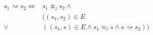 \begin{align*}
  s_1 \rightsquigarrow s_2 \Longleftrightarrow
    & s_1 \not\approx_l s_2 \wedge \\
    & ((s_1,s_2)\in E \\
    \vee & \left( (s_1,s)\in E \wedge s_1 \approx_l s\wedge s \rightsquigarrow s_2 \right)
    )
\end{align*}
